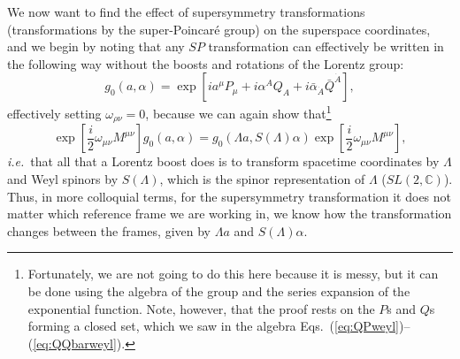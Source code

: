 \documentclass[notes.tex]{subfiles}
\begin{document}
We now want to find the effect of supersymmetry transformations (transformations by the super-Poincaré group) on the superspace coordinates, and we begin by noting that any $SP$ transformation can effectively be written in the following way without the boosts and rotations of the Lorentz group:
\[g_0(a,\alpha) = \exp[ia^\mu P_\mu + i\alpha^AQ_A +i\bar{\alpha}_{\dot{A}}\bar{Q}^{\dot{A}}],\]
effectively setting $\omega_{\rho\nu}=0$, because we can again show that\footnote{Fortunately, we are not going to do this here because it is messy, but it can be done using the algebra of the group and the series expansion of the exponential function. Note, however, that the proof rests on the $P$s and $Q$s forming a closed set, which we saw in the algebra Eqs.~(\ref{eq:QPweyl})--(\ref{eq:QQbarweyl}).}
\begin{equation}
\exp\left[\frac{i}{2}\omega_{\mu\nu}M^{\mu\nu}\right]g_0(a,\alpha) = g_0(\Lambda a,S(\Lambda)\alpha)\exp\left[\frac{i}{2}\omega_{\mu\nu}M^{\mu\nu}\right],
\end{equation}
{\it i.e.}\ that all that a Lorentz boost does is to transform spacetime coordinates by $\Lambda$ and Weyl spinors by $S(\Lambda)$, which is the spinor representation of $\Lambda$ ($SL(2,\mathbb C)$). Thus, in more colloquial terms, for the supersymmetry transformation it does not matter which reference frame we are working in, we know how the transformation changes between the frames, given by  $\Lambda a$  and $S(\Lambda)\alpha$. 
\end{document}
